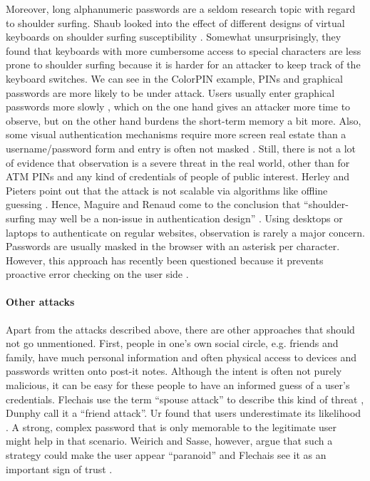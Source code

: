 Moreover, long alphanumeric passwords are a seldom research topic with regard to shoulder surfing. Shaub \etal looked into the effect of different designs of virtual keyboards on shoulder surfing susceptibility \cite{Schaub2012PasswordShoulderSurfing}. Somewhat unsurprisingly, they found that keyboards with more cumbersome access to special characters are less prone to shoulder surfing because it is harder for an attacker to keep track of the keyboard switches. We can see in the ColorPIN example, PINs and graphical passwords are more likely to be under attack. Users usually enter graphical passwords more slowly \cite{Tari2006ShoulderSurfingComparison, Wiedenbeck2006ConvexHull, Renaud2009VisualSnakeOil}, which on the one hand gives an attacker more time to observe, but on the other hand burdens the short-term memory a bit more. Also, some visual authentication mechanisms require more screen real estate than a username/password form and entry is often not masked \cite{Biddle2009GraphicalFirstTwelveYears}. Still, there is not a lot of evidence that observation is a severe threat in the real world, other than for ATM PINs and any kind of credentials of people of public interest. Herley and Pieters point out that the attack is not scalable via algorithms like offline guessing \cite{Herley2015Counterfactuals}. Hence, Maguire and Renaud come to the conclusion that ``shoulder-surfing may well be a non-issue in authentication design'' \cite{Maguire2012YouOnlyLiveTwice}. 
Using desktops or laptops to authenticate on regular websites, observation is rarely a major concern. Passwords are usually masked in the browser with an asterisk per character. However, this approach has recently been questioned because it prevents proactive error checking on the user side \cite{Sasse2016DebunkingMyths}. 

\paragraph{Other attacks} 
Apart from the attacks described above, there are other approaches that should not go unmentioned. First, people in one's own social circle, e.g. friends and family, have much personal information and often physical access to devices and passwords written onto post-it notes. Although the intent is often not purely malicious, it can be easy for these people to have an informed guess of a user's credentials. Flechais \etal use the term ``spouse attack'' to describe this kind of threat \cite{Flechais2013SaudiArabiaTrust}, Dunphy \etal call it a ``friend attack''. Ur \etal found that users underestimate its likelihood \cite{Ur2016PerceptionsPassword}. A strong, complex password that is only memorable to the legitimate user might help in that scenario. Weirich and Sasse, however, argue that such a strategy could make the user appear ``paranoid'' \cite{Weirich2001PrettyGoodPersuasion} and Flechais \etal see it as an important sign of trust \cite{Flechais2005DivideConquerTrust, Flechais2013SaudiArabiaTrust}. 
 
